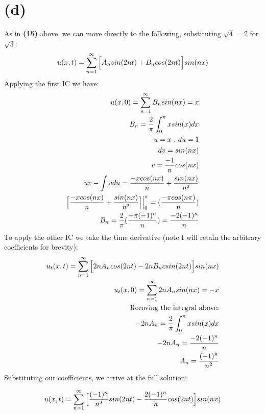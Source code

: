 \documentclass{article}
\begin{document}
\section*{\textbf{(d)}}
As in \textbf{(15)} above, we can move directly to the following, substituting $\sqrt{4} = 2$ for $\sqrt{3}$:
\begin{equation}
\begin{aligned}
u(x,t) = \sum^{\infty}_{n=1}\Big{[}A_nsin(2nt) + B_ncos(2nt)\Big{]}sin(nx)
\end{aligned}
\end{equation}
Applying the first IC we have:
\begin{equation}
\begin{aligned}
u(x,0)=\sum_{n=1}^{\infty}B_nsin(nx) = x\\
B_n = \frac{2}{\pi}\int_0^\pi xsin(x)dx\\
u = x \text{ , } du = 1\\
dv = sin(nx)\\
v = \frac{-1}{n}cos(nx)\\
uv - \int vdu = \frac{-x cos(nx)}{n} + \frac{sin(nx)}{n^2}\\
\Big{[}\frac{-x cos(nx)}{n} + \frac{sin(nx)}{n^2}\Big{]}\Big{|}^\pi_0 = (\frac{-\pi cos(n\pi)}{n})\\
B_n = \frac{2}{\pi}(\frac{-\pi (-1)^n}{n}) = \frac{-2(-1)^n}{n}
\end{aligned}
\end{equation}
To apply the other IC we take the time derivative (note I will retain the arbitrary coefficients for brevity):
\begin{equation}
\begin{aligned}
u_t(x,t)= \sum^{\infty}_{n=1}\Big{[}2nA_ncos(2nt) - 2nB_ncsin(2nt)\Big{]}sin(nx)\\
u_t(x,0) = \sum_{n=1}^{\infty}2nA_nsin(nx) = -x\\
\text{Recoving the integral above:}\\
-2nA_n = \frac{2}{\pi}\int_0^\pi xsin(x)dx\\
-2nA_n = \frac{-2(-1)^n}{n}\\
A_n = \frac{(-1)^n}{n^2}
\end{aligned}
\end{equation}
Substituting our coefficients, we arrive at the full solution:
\begin{tcolorbox}[minipage,colback=white,arc=0pt,outer arc=0pt]
\begin{equation}
\begin{aligned}
u(x,t) = \sum^{\infty}_{n=1}\Big{[}\frac{(-1)^n}{n^2}sin(2nt) - \frac{2(-1)^n}{n}cos(2nt)\Big{]}sin(nx)
\end{aligned}
\end{equation}
\end{tcolorbox}
\end{document}
